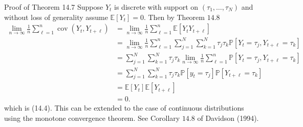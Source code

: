 \documentclass[10pt]{article}
\begin{document}
Proof of Theorem 14.7 Suppose $Y_{t}$ is discrete with support on $\left(\tau_{1}, \ldots, \tau_{N}\right)$ and without loss of generality assume $\mathbb{E}\left[Y_{t}\right]=0$. Then by Theorem $14.8$
$$
\begin{aligned}
\lim _{n \rightarrow \infty} \frac{1}{n} \sum_{\ell=1}^{n} \operatorname{cov}\left(Y_{t}, Y_{t+\ell}\right) &=\lim _{n \rightarrow \infty} \frac{1}{n} \sum_{\ell=1}^{n} \mathbb{E}\left[Y_{t} Y_{t+\ell}\right] \\
&=\lim _{n \rightarrow \infty} \frac{1}{n} \sum_{\ell=1}^{n} \sum_{j=1}^{N} \sum_{k=1}^{N} \tau_{j} \tau_{k} \mathbb{P}\left[Y_{t}=\tau_{j}, Y_{t+\ell}=\tau_{k}\right] \\
&=\sum_{j=1}^{N} \sum_{k=1}^{N} \tau_{j} \tau_{k} \lim _{n \rightarrow \infty} \frac{1}{n} \sum_{\ell=1}^{n} \mathbb{P}\left[Y_{t}=\tau_{j}, Y_{t+\ell}=\tau_{k}\right] \\
&=\sum_{j=1}^{N} \sum_{k=1}^{N} \tau_{j} \tau_{k} \mathbb{P}\left[y_{t}=\tau_{j}\right] \mathbb{P}\left[Y_{t+\ell}=\tau_{k}\right] \\
&=\mathbb{E}\left[Y_{t}\right] \mathbb{E}\left[Y_{t+\ell}\right] \\
&=0 .
\end{aligned}
$$
which is (14.4). This can be extended to the case of continuous distributions using the monotone convergence theorem. See Corollary $14.8$ of Davidson (1994).
\end{document}
